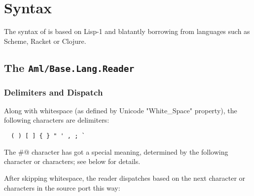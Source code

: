 
\chapter{Syntax}
\label{ch:aml-base-syntax}

The syntax of \AmlBase is based on Lisp-1 and blatantly borrowing from languages such as Scheme, Racket or Clojure.




\section[The Aml/Base.Lang.Reader]{The \lstinline!Aml/Base.Lang.Reader!}
\label{sec:aml-base-lang-reader}




\subsection{Delimiters and Dispatch}

Along with whitespace (as defined by Unicode "White\_Space" property), the following characters are delimiters:

\begin{lstlisting}
  ( ) [ ] { } " ' , ; `
\end{lstlisting}

The \lstinline@#@ character has got a special meaning, determined by the following character or characters; see below for details. 

After skipping whitespace, the \AmlBase reader dispatches based on the next character or characters in the source port this way:

